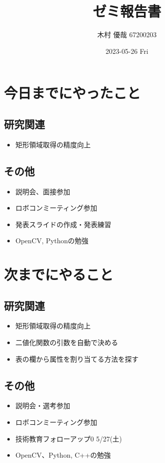 \documentclass[uplatex, onecolumn, 10pt]{jsarticle}
\begin{document}
\title{\vspace{-40mm}\bf{\LARGE{ゼミ報告書}}}
\author{\vspace{-40mm}木村 優哉 67200203}
\date{2023-05-26 Fri}
\maketitle


\section{今日までにやったこと}

\subsection*{研究関連}
\begin{itemize}
	\item 矩形領域取得の精度向上
\end{itemize}

\subsection*{その他}
\begin{itemize}
	\item 説明会、面接参加
	\item ロボコンミーティング参加
	\item 発表スライドの作成・発表練習
	\item OpenCV, Pythonの勉強
\end{itemize}


\section{次までにやること}

\subsection*{研究関連}
\begin{itemize}
	\item 矩形領域取得の精度向上
	\item 二値化関数の引数を自動で決める
	\item 表の欄から属性を割り当てる方法を探す
\end{itemize}

\subsection*{その他}
\begin{itemize}
	\item 説明会・選考参加
	\item ロボコンミーティング参加
	\item 技術教育フォローアップ0 5/27(土)
	\item OpenCV、Python, C++の勉強
\end{itemize}
\end{document}
